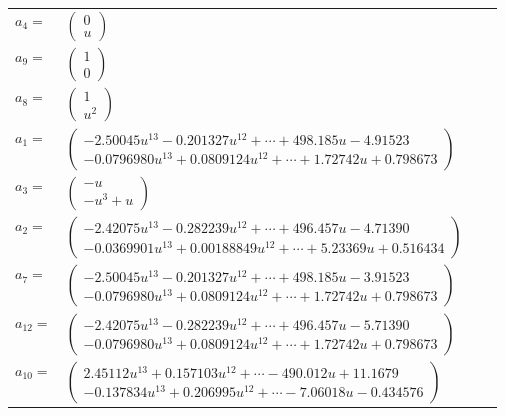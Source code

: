 \documentclass[1p]{elsarticle_modified}
\theoremstyle{definition}
\begin{document}
\begin{tabular}{m{7pt} m{180pt} m{7pt} m{180pt} }
\flushright $a_{4}=$&$\begin{pmatrix}0\\u\end{pmatrix}$ \\
\flushright $a_{9}=$&$\begin{pmatrix}1\\0\end{pmatrix}$ \\
\flushright $a_{8}=$&$\begin{pmatrix}1\\u^2\end{pmatrix}$ \\
\flushright $a_{1}=$&$\begin{pmatrix}-2.50045 u^{13}-0.201327 u^{12}+\cdots+498.185 u-4.91523\\-0.0796980 u^{13}+0.0809124 u^{12}+\cdots+1.72742 u+0.798673\end{pmatrix}$ \\
\flushright $a_{3}=$&$\begin{pmatrix}- u\\- u^3+u\end{pmatrix}$ \\
\flushright $a_{2}=$&$\begin{pmatrix}-2.42075 u^{13}-0.282239 u^{12}+\cdots+496.457 u-4.71390\\-0.0369901 u^{13}+0.00188849 u^{12}+\cdots+5.23369 u+0.516434\end{pmatrix}$ \\
\flushright $a_{7}=$&$\begin{pmatrix}-2.50045 u^{13}-0.201327 u^{12}+\cdots+498.185 u-3.91523\\-0.0796980 u^{13}+0.0809124 u^{12}+\cdots+1.72742 u+0.798673\end{pmatrix}$ \\
\flushright $a_{12}=$&$\begin{pmatrix}-2.42075 u^{13}-0.282239 u^{12}+\cdots+496.457 u-5.71390\\-0.0796980 u^{13}+0.0809124 u^{12}+\cdots+1.72742 u+0.798673\end{pmatrix}$ \\
\flushright $a_{10}=$&$\begin{pmatrix}2.45112 u^{13}+0.157103 u^{12}+\cdots-490.012 u+11.1679\\-0.137834 u^{13}+0.206995 u^{12}+\cdots-7.06018 u-0.434576\end{pmatrix}$ \\

\end{tabular}
\end{document}
